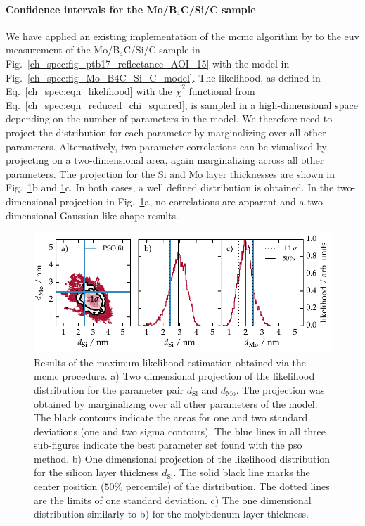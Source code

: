 \paragraph{Confidence intervals for the Mo/B$_4$C/Si/C sample}
We have applied an existing implementation of the \gls{mcmc} algorithm by \textcite{foreman-mackey_emcee:_2013} to the \gls{euv} measurement of the Mo/B$_4$C/Si/C sample in Fig.~\ref{ch_spec:fig_ptb17_reflectance_AOI_15} with the model in Fig.~\ref{ch_spec:fig_Mo_B4C_Si_C_model}. The likelihood, as defined in Eq.~\eqref{ch_spec:eqn_likelihood} with the $\tilde{\chi}^2$ functional from Eq.~\eqref{ch_spec:eqn_reduced_chi_squared}, is sampled in a high-dimensional space depending on the number of parameters in the model. We therefore need to project the distribution for each parameter by marginalizing over all other parameters. Alternatively, two-parameter correlations can be visualized by projecting on a two-dimensional area, again marginalizing across all other parameters. The projection for the Si and Mo layer thicknesses are shown in Fig.~\ref{ch_spec:fig_ptb17_MCMC_d_Mo_vs_d_Si}b and \ref{ch_spec:fig_ptb17_MCMC_d_Mo_vs_d_Si}c. In both cases, a well defined distribution is obtained. In the two-dimensional projection in Fig.~\ref{ch_spec:fig_ptb17_MCMC_d_Mo_vs_d_Si}a, no correlations are apparent and a two-dimensional Gaussian-like shape results.
\begin{figure}[htbp]
\centering
\includegraphics{img/PTB17_MCMC_d_Mo_vs_d_Si}
\caption[Results of the maximum likelihood estimation for Mo and Si thicknesses of the Mo/B$_4$C/Si/C sample.]{Results of the maximum likelihood estimation obtained via the \gls{mcmc} procedure. a) Two dimensional projection of the likelihood distribution for the parameter pair $d_\text{Si}$ and $d_\text{Mo}$. The projection was obtained by marginalizing over all other parameters of the model. The black contours indicate the areas for one and two standard deviations (one and two sigma contours). The blue lines in all three sub-figures indicate the best parameter set found with the \gls{pso} method. b) One dimensional projection of the likelihood distribution for the silicon layer thickness $d_\text{Si}$. The solid black line marks the center position ($50\%$ percentile) of the distribution. The dotted lines are the limits of one standard deviation. c) The one dimensional distribution similarly to b) for the molybdenum layer thickness.}
\label{ch_spec:fig_ptb17_MCMC_d_Mo_vs_d_Si}
\end{figure}
